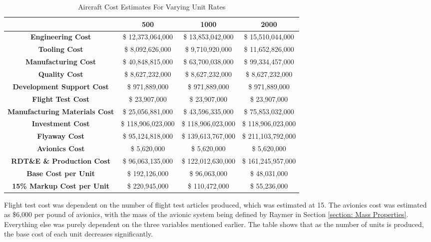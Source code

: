 \begin{table}[!h]
    \centering
        \caption{Aircraft Cost Estimates For Varying Unit Rates}
    \begin{tabular}{|c||c|c|c|}\toprule
         & \textbf{500} & \textbf{1000} & \textbf{2000} \\\hline \hline
         \textbf{Engineering Cost} & \$ 12,373,064,000 & \$ 13,853,042,000 & \$ 15,510,044,000 \\ \hline
         \textbf{Tooling Cost} & \$ 8,092,626,000 & \$ 9,710,920,000 & \$ 11,652,826,000 \\ \hline
         \textbf{Manufacturing Cost} & \$ 40,848,815,000 & \$ 63,700,038,000 & \$ 99,334,457,000 \\ \hline
         \textbf{Quality Cost} &  \$ 8,627,232,000  & \$ 8,627,232,000 & \$ 8,627,232,000 \\ \hline
         \textbf{Development Support Cost} & \$ 971,889,000 & \$ 971,889,000 & \$ 971,889,000  \\ \hline
         \textbf{Flight Test Cost} &  \$ 23,907,000 & \$ 23,907,000 & \$ 23,907,000 \\ \hline
         \textbf{Manufacturing Materials Cost} &  \$ 25,056,881,000  &  \$ 43,596,335,000 &  \$ 75,853,032,000 \\ \hline
         \textbf{Investment Cost} & \$ 118,906,023,000 & \$ 118,906,023,000 & \$ 118,906,023,000 \\ \hline
         \textbf{Flyaway Cost} &  \$ 95,124,818,000 &  \$ 139,613,767,000 &  \$ 211,103,792,000 \\ \hline
         \textbf{Avionics Cost} &  \$ 5,620,000 & \$ 5,620,000 & \$ 5,620,000  \\ \hline
         \textbf{RDT\&E \& Production Cost} &  \$ 96,063,135,000 &  \$ 122,012,630,000 &  \$ 161,245,957,000   \\ \hline
         \textbf{Base Cost per Unit} &  \$ 192,126,000 &  \$ 96,063,000 &  \$ 48,031,000 \\ \hline
         \textbf{15\% Markup Cost per Unit} &  \$ 220,945,000 &  \$ 110,472,000 &  \$ 55,236,000 \\\bottomrule
    \end{tabular}
    \label{tab:prodcost}
\end{table}

Flight test cost was dependent on the number of flight test articles produced, which was estimated at 15. The avionics cost was estimated as \$6,000 per pound of avionics, with the mass of the avionic system being defined by Raymer \cite{raymer} in Section \ref{section: Mass Properties}. Everything else was purely dependent on the three variables mentioned earlier. The table shows that as the number of units is produced, the base cost of each unit decreases significantly. 


